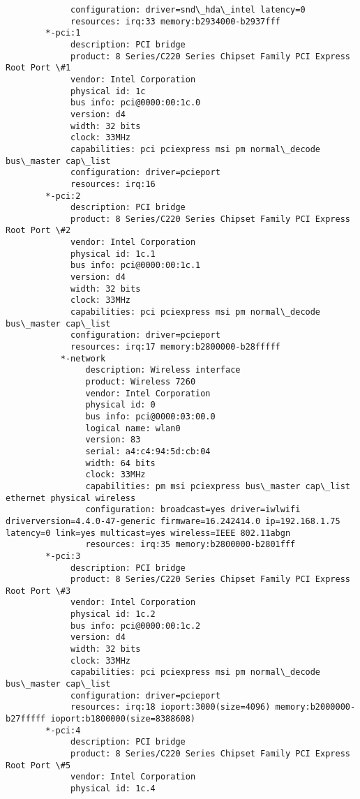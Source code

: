 \begin{verbatim}
             configuration: driver=snd\_hda\_intel latency=0
             resources: irq:33 memory:b2934000-b2937fff
        *-pci:1
             description: PCI bridge
             product: 8 Series/C220 Series Chipset Family PCI Express Root Port \#1
             vendor: Intel Corporation
             physical id: 1c
             bus info: pci@0000:00:1c.0
             version: d4
             width: 32 bits
             clock: 33MHz
             capabilities: pci pciexpress msi pm normal\_decode bus\_master cap\_list
             configuration: driver=pcieport
             resources: irq:16
        *-pci:2
             description: PCI bridge
             product: 8 Series/C220 Series Chipset Family PCI Express Root Port \#2
             vendor: Intel Corporation
             physical id: 1c.1
             bus info: pci@0000:00:1c.1
             version: d4
             width: 32 bits
             clock: 33MHz
             capabilities: pci pciexpress msi pm normal\_decode bus\_master cap\_list
             configuration: driver=pcieport
             resources: irq:17 memory:b2800000-b28fffff
           *-network
                description: Wireless interface
                product: Wireless 7260
                vendor: Intel Corporation
                physical id: 0
                bus info: pci@0000:03:00.0
                logical name: wlan0
                version: 83
                serial: a4:c4:94:5d:cb:04
                width: 64 bits
                clock: 33MHz
                capabilities: pm msi pciexpress bus\_master cap\_list ethernet physical wireless
                configuration: broadcast=yes driver=iwlwifi driverversion=4.4.0-47-generic firmware=16.242414.0 ip=192.168.1.75 latency=0 link=yes multicast=yes wireless=IEEE 802.11abgn
                resources: irq:35 memory:b2800000-b2801fff
        *-pci:3
             description: PCI bridge
             product: 8 Series/C220 Series Chipset Family PCI Express Root Port \#3
             vendor: Intel Corporation
             physical id: 1c.2
             bus info: pci@0000:00:1c.2
             version: d4
             width: 32 bits
             clock: 33MHz
             capabilities: pci pciexpress msi pm normal\_decode bus\_master cap\_list
             configuration: driver=pcieport
             resources: irq:18 ioport:3000(size=4096) memory:b2000000-b27fffff ioport:b1800000(size=8388608)
        *-pci:4
             description: PCI bridge
             product: 8 Series/C220 Series Chipset Family PCI Express Root Port \#5
             vendor: Intel Corporation
             physical id: 1c.4

\end{verbatim}
